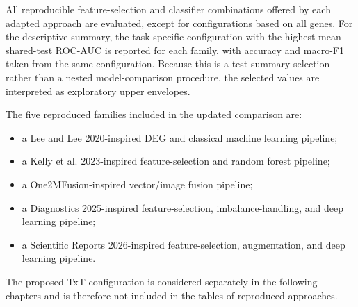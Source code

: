 All reproducible feature-selection and classifier combinations offered by each adapted approach are evaluated, except for configurations based on all genes. For the descriptive summary, the task-specific configuration with the highest mean shared-test ROC-AUC is reported for each family, with accuracy and macro-F1 taken from the same configuration. Because this is a test-summary selection rather than a nested model-comparison procedure, the selected values are interpreted as exploratory upper envelopes.

The five reproduced families included in the updated comparison are:
\begin{itemize}
    \item a Lee and Lee 2020-inspired DEG and classical machine learning pipeline;
    \item a Kelly et al. 2023-inspired feature-selection and random forest pipeline;
    \item a One2MFusion-inspired vector/image fusion pipeline;
    \item a Diagnostics 2025-inspired feature-selection, imbalance-handling, and deep learning pipeline;
    \item a Scientific Reports 2026-inspired feature-selection, augmentation, and deep learning pipeline.
\end{itemize}

The proposed TxT configuration is considered separately in the following chapters and is therefore not included in the tables of reproduced approaches.


